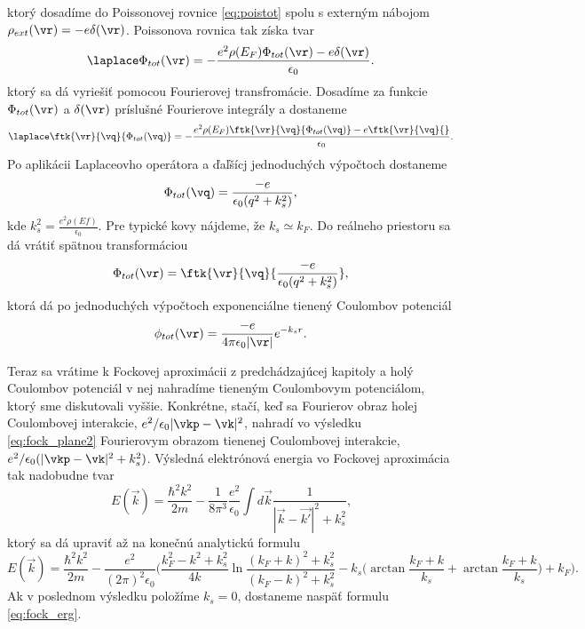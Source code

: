 ktorý dosadíme do Poissonovej rovnice \eqref{eq:poistot}  spolu s externým nábojom $\rho_{ext}(\vr)=-e\delta(\vr)$. Poissonova rovnica tak získa tvar
 \begin{equation}
  \label{eq:poistot_final}
   \laplace \Phi_{tot}(\vr)=-\frac{e^2\rho(E_F)\Phi_{tot}(\vr)-e\delta(\vr)}{\epsilon_0} \text{.}
 \end{equation}
 ktorý sa dá vyriešiť pomocou Fourierovej transfromácie. Dosadíme za funkcie $\Phi_{tot}(\vr)$ a $\delta(\vr)$ príslušné Fourierove integrály a dostaneme  
 \begin{equation}
  \laplace \ftk{\vr}{\vq}{\Phi_{tot}(\vq)}=-\frac{e^2 \rho(E_F) \ftk{\vr}{\vq}{ \Phi_{tot}(\vq)}-e\ftk{\vr}{\vq}{}}{\epsilon_0} 
    \text{.}
 \end{equation}
 Po aplikácii Laplaceovho operátora a ďaľšícj jednoduchých výpočtoch dostaneme
 \begin{equation}
  \label{eq:screenpot_FT}
  \Phi_{tot}(\vq)=\frac{-e}{\epsilon_0(q^2+k_s^2)}\text{,}
 \end{equation}
kde $k_s^2=\frac{e^2 \rho(Ef)}{\epsilon_0}$. Pre typické kovy nájdeme, že $k_s \simeq k_F$.
Do reálneho priestoru sa dá vrátiť spätnou transformáciou
 \begin{equation}
 \Phi_{tot}(\vr)=\ftk{\vr}{\vq}{\frac{-e}{\epsilon_0(q^2+k_s^2)}} \text{,}
 \end{equation}
ktorá dá po jednoduchých výpočtoch exponenciálne tienený Coulombov potenciál
 \begin{equation}
  \label{eq:yukav_pot}
  \phi_{tot}(\vr)=\frac{-e}{4\pi\epsilon_0 |\vr| }e^{-k_s r} \text{.}
 \end{equation}
 
 Teraz sa vrátime k Fockovej aproximácii z predchádzajúcej kapitoly a holý Coulombov potenciál v nej nahradíme tieneným Coulombovym potenciálom, ktorý sme diskutovali vyššie. Konkrétne, stačí, keď sa Fourierov obraz holej Coulombovej interakcie, $e^2/\epsilon_0|\vkp-\vk|^2$, nahradí vo výsledku \eqref{eq:fock_plane2}
 Fourierovym obrazom tienenej Coulombovej interakcie, $e^2/\epsilon_0(|\vkp-\vk|^2+k_s^2)$.
Výsledná elektrónová energia vo Fockovej aproximácia tak nadobudne tvar
 \begin{equation}
  \label{eq:fock_screen}
  E(\vec{k})=\frac{\hbar^2 k^2}{2m} - \frac{1}{8\pi^3}  \frac{e^2}{\epsilon_0}  \int d\vec{k} \frac{1}{|\vec{k}-\vec{k'}|^2+k_s^2} \text{,}
 \end{equation}
 ktorý sa dá upraviť až na konečnú analytickú formulu
 \begin{equation}
  \label{eq:fock_screen_final}
  E(\vec{k})=\frac{\hbar^2 k^2} {2m} - \frac{e^2}{(2\pi)^2\epsilon_0} \biggl(
    \frac{k_F^2-k^2+k_s^2}{4k} \ln{\frac{(k_F+k)^2+k_s^2}{(k_F-k)^2+k_s^2}}-k_s\bigl(\arctan{\frac{k_F+k}{k_s}}+\arctan{\frac{k_F+k}{k_s}}\bigr)+k_F\biggr) \text{.}
 \end{equation}
 Ak v poslednom výsledku položíme $k_s = 0$, dostaneme naspäť formulu \eqref{eq:fock_erg}. 
 
